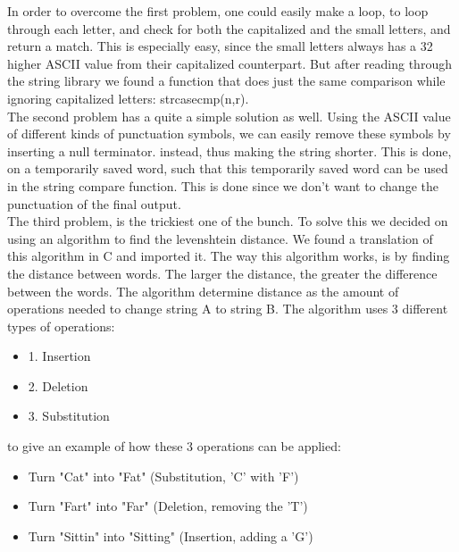 In order to overcome the first problem, one could easily make a loop, to loop through each letter, and check for both the capitalized and the small letters,
and return a match. This is especially easy, since the small letters always has a 32 higher ASCII value from their capitalized counterpart.
But after reading through the string library we found a function that does just the same comparison while ignoring capitalized letters: strcasecmp(n,r).
\\
The second problem has a quite a simple solution as well. Using the ASCII value of different kinds of punctuation symbols, we can easily remove these symbols by inserting a null terminator. 
instead, thus making the string shorter. This is done, on a temporarily saved word, such that this temporarily saved word can be used in the string compare function. This is done since we don't want to change the punctuation of the final output.
\\
The third problem, is the trickiest one of the bunch. To solve this we decided on using an algorithm to find the levenshtein distance. 
We found a translation of this algorithm in C and imported it\cite{levenshtein}.
The way this algorithm works, is by finding the distance between words. The larger the distance, the greater the difference between the words.
The algorithm determine distance as the amount of operations needed to change string A to string B. The algorithm uses 3 different types of operations:
\begin{itemize}
  \item 1. Insertion
  \item 2. Deletion
  \item 3. Substitution
\end{itemize}

to give an example of how these 3 operations can be applied:
\begin{itemize}
  \item Turn "Cat" into "Fat"  (Substitution, 'C' with 'F')
  \item Turn "Fart" into "Far"  (Deletion, removing the 'T')
  \item Turn "Sittin" into "Sitting"  (Insertion, adding a 'G')
\end{itemize}

